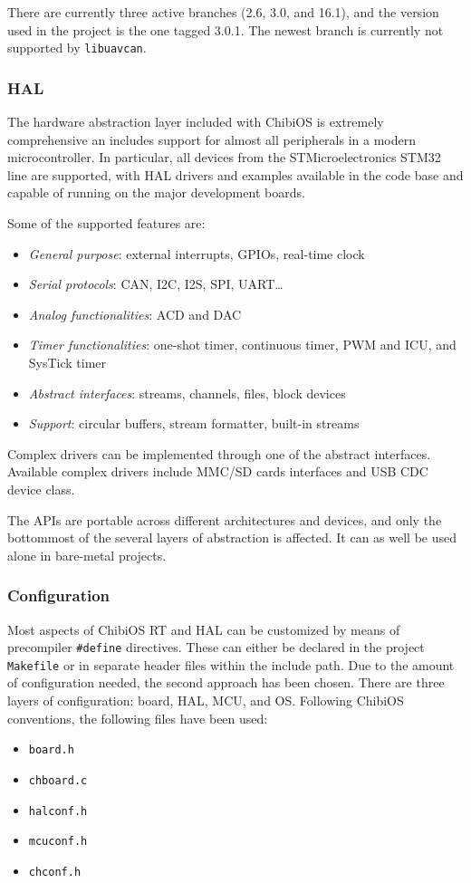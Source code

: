 There are currently three active branches (2.6, 3.0, and 16.1), and the version used in the project is the one tagged 3.0.1.
The newest branch is currently not supported by \texttt{libuavcan}.


\subsubsection{HAL}
The hardware abstraction layer included with ChibiOS is extremely comprehensive an includes support for almost all peripherals in a modern microcontroller.
In particular, all devices from the STMicroelectronics STM32 line are supported, with HAL drivers and examples available in the code base and capable of running on the major development boards.

Some of the supported features are:
\begin{itemize}
    \item \emph{General purpose}: external interrupts, GPIOs, real-time clock
    \item \emph{Serial protocols}: CAN, I2C, I2S, SPI, UART\dots
    \item \emph{Analog functionalities}: ACD and DAC
    \item \emph{Timer functionalities}: one-shot timer, continuous timer, PWM and ICU, and SysTick timer
    \item \emph{Abstract interfaces}: streams, channels, files, block devices
    \item \emph{Support}: circular buffers, stream formatter, built-in streams
\end{itemize}
Complex drivers can be implemented through one of the abstract interfaces.
Available complex drivers include MMC/SD cards interfaces and USB CDC device class.

The APIs are portable across different architectures and devices, and only the bottommost of the several layers of abstraction is affected.
It can as well be used alone in bare-metal projects.


\subsubsection{Configuration}
Most aspects of ChibiOS RT and HAL can be customized by means of precompiler \texttt{\#define} directives.
These can either be declared in the project \texttt{Makefile} or in separate header files within the include path.
Due to the amount of configuration needed, the second approach has been chosen.
There are three layers of configuration: board, HAL, MCU, and OS.
Following ChibiOS conventions, the following files have been used:
\begin{itemize}
    \item \texttt{board.h}
    \item \texttt{chboard.c}
    \item \texttt{halconf.h}
    \item \texttt{mcuconf.h}
    \item \texttt{chconf.h}
\end{itemize}

